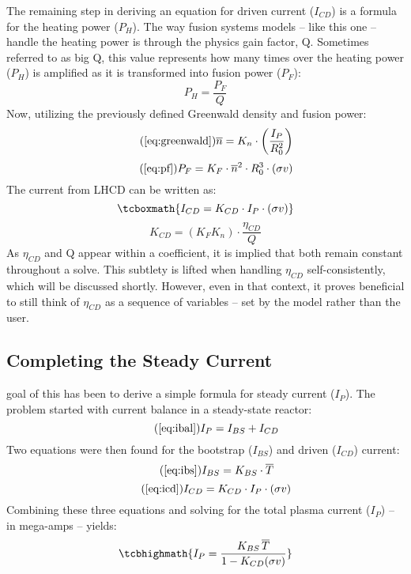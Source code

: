 The remaining step in deriving an equation for driven current ($I_{CD}$) is a formula for the heating power ($P_H$). The way fusion systems models -- like this one -- handle the heating power is through the physics gain factor, Q. Sometimes referred to as big Q, this value represents how many times over the heating power ($P_H$) is amplified as it is transformed into fusion power ($P_F$):
\begin{equation}
	\label{eq:ph}
	P_H = \frac{P_F}{Q}
\end{equation}
Now, utilizing the previously defined Greenwald density and fusion power:
 \begin{equation}
 	\tag{\ref{eq:greenwald}}
 	\overline n = K_n \cdot \left( \frac{I_P}{R_0^2} \right)
 \end{equation}
 \begin{equation}
	\tag{\ref{eq:pf}}
	P_F = K_F \cdot \overline{n}^2 \cdot R_0^3  \cdot (\sigma v)
\end{equation}
The current from LHCD can be written as:
\begin{equation}
	\label{eq:icd}
	\tcboxmath{
	I_{CD} = K_{CD} \cdot I_P \cdot ( \sigma v )
	}
\end{equation}
\begin{equation}
	K_{CD} = \left( K_F K_n \right) \cdot \frac{\eta_{CD}}{Q}
\end{equation}
As $\eta_{CD}$ and Q appear within a  coefficient, it is implied that both remain constant throughout a solve. This subtlety is lifted when handling $\eta_{CD}$ self-consistently, which will be discussed shortly. However, even in that context, it proves beneficial to still think of $\eta_{CD}$ as a sequence of  variables -- set by the model rather than the user.

\subsection{Completing the Steady Current}

 goal of this  has been to derive a simple formula for steady current ($I_P$). The problem started with current balance in a steady-state reactor:
\begin{equation}
	\tag{\ref{eq:ibal}}
	I_P = I_{BS} + I_{CD}
\end{equation}
Two equations were then found for the bootstrap ($I_{BS}$) and driven ($I_{CD}$) current:
\begin{equation}
	\tag{\ref{eq:ibs}}
	I_{BS} = K_{BS} \cdot \overline T
\end{equation}
\begin{equation}
	\tag{\ref{eq:icd}}
	I_{CD} = K_{CD} \cdot I_P \cdot ( \sigma v )
\end{equation}
Combining these three equations and solving for the total plasma current ($I_P$) -- in mega-amps -- yields:
\begin{equation}
	\label{eq:steady}
	\tcbhighmath{
	I_P = \frac{ K_{BS} \, \overline T }{ 1 - K_{CD} ( \sigma v ) }
	}
\end{equation}

